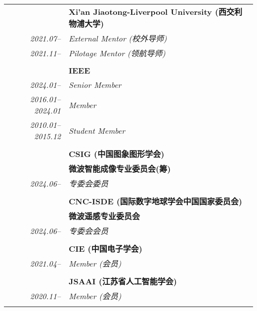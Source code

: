\documentclass[paper=a4,fontsize=11pt]{scrartcl}
\begin{document}
\begin{longtable}{r|p{11cm}}
	
	~ & \textbf{Xi'an Jiaotong-Liverpool University (西交利物浦大学)}\\
	\emph{2021.07--} & \emph{External Mentor (校外导师)}\\
	\emph{2021.11--} & \emph{Pilotage Mentor (领航导师)}\\
	\multicolumn{2}{c}{} \\
	
	
	
	~ & \textbf{IEEE}\\
	\emph{2024.01--} & \emph{Senior Member}\\
	\emph{2016.01--2024.01} & \emph{Member}\\
	\emph{2010.01--2015.12} & \emph{Student Member}\\
	\multicolumn{2}{c}{} \\
	
	~ & \textbf{CSIG (中国图象图形学会)}\\
	~ & \textbf{微波智能成像专业委员会(筹)} \\
	\emph{2024.06--} & \emph{专委会委员}\\
	\multicolumn{2}{c}{} \\
	
	~ & \textbf{CNC-ISDE (国际数字地球学会中国国家委员会)}\\
	~ & \textbf{微波遥感专业委员会}\\
	\emph{2024.06--} & \emph{专委会会员}\\
	\multicolumn{2}{c}{} \\
	
	
	~ & \textbf{CIE (中国电子学会)} \\
	\emph{2021.04--} & \emph{Member (会员)}\\
	\multicolumn{2}{c}{} \\
	

	
	
	~ & \textbf{JSAAI (江苏省人工智能学会)} \\
	\emph{2020.11--} & \emph{Member (会员)}\\
	\multicolumn{2}{c}{} 
	
	
\end{longtable}
\end{document}

